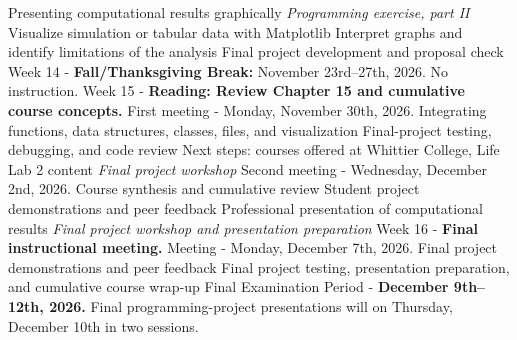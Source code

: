 \documentclass[10pt]{article}
\begin{document}
\begin{outline}[enumerate]
\3 Presenting computational results graphically
\3 \textit{Programming exercise, part II}
\4 Visualize simulation or tabular data with Matplotlib
\4 Interpret graphs and identify limitations of the analysis
\4 Final project development and proposal check
\1 Week 14 - \textbf{Fall/Thanksgiving Break:} November 23rd--27th, 2026. No instruction.
\1 Week 15 - \textbf{Reading: Review Chapter 15 and cumulative course concepts.}
\2 First meeting - Monday, November 30th, 2026.
\3 Integrating functions, data structures, classes, files, and visualization
\3 Final-project testing, debugging, and code review
\3 Next steps: courses offered at Whittier College, Life Lab 2 content
\3 \textit{Final project workshop}
\2 Second meeting - Wednesday, December 2nd, 2026.
\3 Course synthesis and cumulative review
\3 Student project demonstrations and peer feedback
\3 Professional presentation of computational results
\3 \textit{Final project workshop and presentation preparation}
\1 Week 16 - \textbf{Final instructional meeting.}
\2 Meeting - Monday, December 7th, 2026.
\3 Final project demonstrations and peer feedback
\3 Final project testing, presentation preparation, and cumulative course wrap-up
\1 Final Examination Period - \textbf{December 9th--12th, 2026.}
\2 Final programming-project presentations will on Thursday, December 10th in two sessions.
\end{outline}
\end{document}

